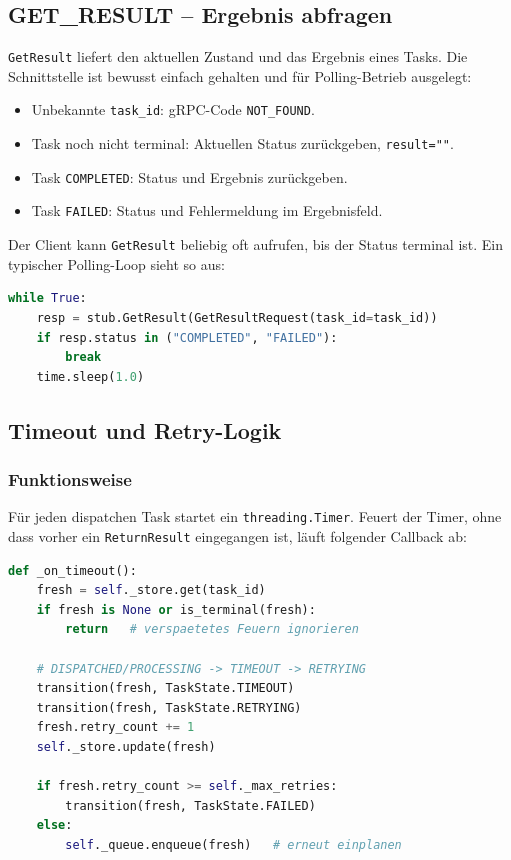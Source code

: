 \subsection{GET\_RESULT -- Ergebnis abfragen}
\label{sec:get-result}

\texttt{GetResult} liefert den aktuellen Zustand und das Ergebnis eines Tasks.
Die Schnittstelle ist bewusst einfach gehalten und für Polling-Betrieb ausgelegt:

\begin{itemize}
  \item Unbekannte \texttt{task\_id}: gRPC-Code \texttt{NOT\_FOUND}.
  \item Task noch nicht terminal: Aktuellen Status zurückgeben, \texttt{result=""}.
  \item Task \texttt{COMPLETED}: Status und Ergebnis zurückgeben.
  \item Task \texttt{FAILED}: Status und Fehlermeldung im Ergebnisfeld.
\end{itemize}
\noindent Der Client kann \texttt{GetResult} beliebig oft aufrufen, bis der Status terminal ist.
Ein typischer Polling-Loop sieht so aus:

\begin{lstlisting}[language=Python,caption={Client-seitiges Polling (Beispiel)}]
while True:
    resp = stub.GetResult(GetResultRequest(task_id=task_id))
    if resp.status in ("COMPLETED", "FAILED"):
        break
    time.sleep(1.0)
\end{lstlisting}

\subsection{Timeout und Retry-Logik}
\label{sec:timeout-retry}

\subsubsection*{Funktionsweise}

Für jeden dispatchen Task startet ein \texttt{threading.Timer}.
Feuert der Timer, ohne dass vorher ein \texttt{ReturnResult} eingegangen ist,
läuft folgender Callback ab:

\begin{lstlisting}[language=Python,caption={Timeout-Callback (\_on\_timeout)}]
def _on_timeout():
    fresh = self._store.get(task_id)
    if fresh is None or is_terminal(fresh):
        return   # verspaetetes Feuern ignorieren

    # DISPATCHED/PROCESSING -> TIMEOUT -> RETRYING
    transition(fresh, TaskState.TIMEOUT)
    transition(fresh, TaskState.RETRYING)
    fresh.retry_count += 1
    self._store.update(fresh)

    if fresh.retry_count >= self._max_retries:
        transition(fresh, TaskState.FAILED)
    else:
        self._queue.enqueue(fresh)   # erneut einplanen
\end{lstlisting}

